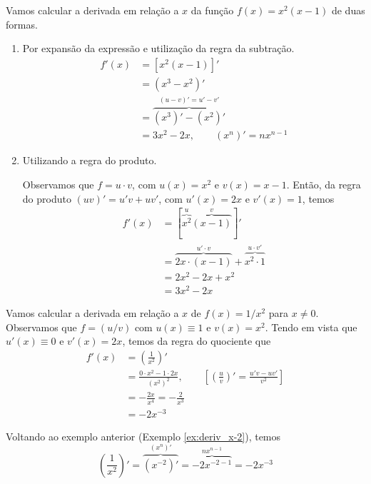 \cleardoublepage\documentclass[../main.tex]{subfiles}
\begin{document}
\begin{ex}
  Vamos calcular a derivada em relação a $x$ da função $f(x) = x^2(x-1)$ de duas formas.
  \begin{enumerate}[1.]
  \item Por expansão da expressão e utilização da regra da subtração.
    \begin{align*}
      f'(x) &= [x^2(x-1)]'\\
            &= (x^3-x^2)' \\
            &= \overbrace{(x^3)'-(x^2)'}^{(u-v)'=u'-v'}\\
            &= 3x^2-2x,\quad\quad(x^n)' = nx^{n-1}
    \end{align*}
  \item Utilizando a regra do produto.

    Observamos que $f = u\cdot v$, com $u(x) = x^2$ e $v(x) = x-1$. Então, da regra do produto $(uv)' = u'v + uv'$, com $u'(x) = 2x$ e $v'(x) = 1$, temos
    \begin{align*}
      f'(x) &= [\overbrace{x^2}^{u}\overbrace{(x-1)}^{v}]'\\
            &= \overbrace{2x\cdot (x-1)}^{u'\cdot v} + \overbrace{x^2\cdot 1}^{u\cdot v'}\\
            &= 2x^2 - 2x + x^2\\
            &= 3x^2 - 2x
    \end{align*}
  \end{enumerate}
\end{ex}

\begin{ex}\label{ex:deriv_x-2}
  Vamos calcular a derivada em relação a $x$ de $f(x) = 1/x^2$ para $x\neq 0$. Observamos que $f = (u/v)$ com $u(x) \equiv 1$ e $v(x) = x^2$. Tendo em vista que $u'(x) \equiv 0$ e $v'(x) = 2x$, temos da regra do quociente que
  \begin{align*}
    f'(x) &= \left(\frac{1}{x^2}\right)' \\
          &= \frac{0\cdot x^2 - 1\cdot 2x}{(x^2)^2},\quad\quad\left[\left(\frac{u}{v}\right)' = \frac{u'v-uv'}{v^2}\right]\\
          &= -\frac{2x}{x^4} = -\frac{2}{x^3}\\
          &= -2x^{-3}
  \end{align*}
\end{ex}

\begin{ex}
  Voltando ao exemplo anterior (Exemplo \ref{ex:deriv_x-2}), temos
  \begin{equation*}
    \left(\frac{1}{x^2}\right)' = \overbrace{(x^{-2})'}^{(x^n)'} = \overbrace{-2x^{-2-1}}^{nx^{n-1}} = -2x^{-3}
  \end{equation*}
\end{ex}
\end{document}
